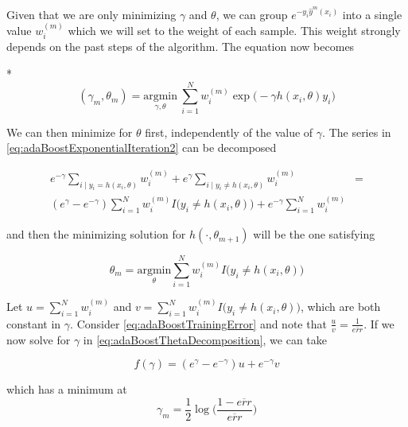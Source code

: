Given that we are only minimizing $\gamma$ and $\theta$, we can group $e^{-y_i \hat{y}^{m}(x_i)}$ into a single value $w_i^{(m)}$ which we will set to the weight of each sample. This weight strongly depends on the past steps of the algorithm. The equation now becomes

*
\begin{equation}\label{eq:adaBoostExponentialIteration2}
(\gamma_{m}, \theta_{m}) = \underset{\gamma, \theta}{\mathrm{argmin}} \  \sum_{i=1}^{N} w_i^{(m)} \exp \big(-\gamma h(x_i,\theta)y_i \big)
\end{equation}

We can then minimize for $\theta$ first, independently of the value of $\gamma$. The series in \cref{eq:adaBoostExponentialIteration2} can be decomposed

\begin{equation}\label{eq:adaBoostThetaDecomposition}
\begin{split}
e^{-\gamma} \sum_{i \mid y_i = h(x_i,\theta)} w_i^{(m)} + e^{\gamma} \sum_{i \mid y_i \neq h(x_i,\theta)} w_i^{(m)} & = \\
( e^{\gamma} - e^{-\gamma}) \sum_{i = 1}^{N} w_i^{(m)} I \big( y_i \neq h(x_i,\theta)  \big) + e^{-\gamma} \sum_{i = 1}^{N}  w_i^{(m)} &
\end{split}
\end{equation}


and then the minimizing solution for $h(\cdot, \theta_{m+1})$ will be the one satisfying

\begin{equation}\label{eq:adaBoostThetaMinimization}
\theta_{m} = \underset{ \theta}{\mathrm{argmin}} \sum_{i=1}^{N} w_i^{(m)} I \big( y_i \neq h(x_i,\theta)  \big)
\end{equation}

Let $u = \sum_{i=1}^{N} w_i^{(m)}$ and $v = \sum_{i=1}^{N} w_i^{(m)} I \big( y_i \neq h(x_i,\theta)  \big) $, which are both constant in $\gamma$. Consider \cref{eq:adaBoostTrainingError} and note that $\frac{u}{v} = \frac{1}{\overline{err}}$. If we now solve for $\gamma$ in \cref{eq:adaBoostThetaDecomposition}, we can take

\begin{equation}\label{eq:adaBoostBetaMinimization}
f(\gamma) = ( e^{\gamma} - e^{-\gamma}) u + e^{-\gamma}v
\end{equation}

which has a minimum at
\begin{equation}
\gamma_{m} = \frac{1}{2} \log\big( \frac{1 - \overline{err} }{ \overline{err} } \big)
\end{equation}

